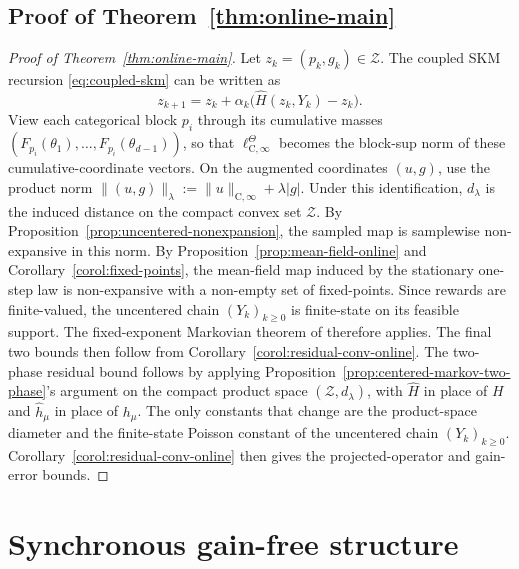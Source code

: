\documentclass{article}
\begin{document}
\subsection{Proof of Theorem~\ref{thm:online-main}}
\begin{proof}[Proof of Theorem~\ref{thm:online-main}]
Let $z_k = (p_k, g_k) \in \mathcal Z$. The coupled SKM recursion \eqref{eq:coupled-skm} can be written as
\begin{equation}
z_{k+1} = z_k + \alpha_k\bigl( \widehat H(z_k, Y_k) - z_k\bigr).
\end{equation}
View each categorical block $p_i$ through its cumulative masses $(F_{p_i}(\theta_1),\ldots,F_{p_i}(\theta_{d-1}))$, so that $\ell^\Theta_{\mathrm C,\infty}$ becomes the block-sup norm of these cumulative-coordinate vectors. On the augmented coordinates $(u,g)$, use the product norm $\lVert(u, g)\rVert_\lambda := \lVert u \rVert_{\mathrm{C},\infty} + \lambda \lvert g \rvert$. Under this identification, $d_\lambda$ is the induced distance on the compact convex set $\mathcal Z$. By Proposition~\ref{prop:uncentered-nonexpansion}, the sampled map is samplewise non-expansive in this norm. By Proposition~\ref{prop:mean-field-online} and Corollary~\ref{corol:fixed-points}, the mean-field map induced by the stationary one-step law is non-expansive with a non-empty set of fixed-points. Since rewards are finite-valued, the uncentered chain $(Y_k)_{k\ge0}$ is finite-state on its feasible support. The fixed-exponent Markovian theorem of \citet{blaser2026asymptotic} therefore applies. The final two bounds then follow from Corollary~\ref{corol:residual-conv-online}. The two-phase residual bound follows by applying Proposition~\ref{prop:centered-markov-two-phase}'s argument on the compact product space $(\mathcal Z, d_\lambda)$, with $\widehat H$ in place of $H$ and $\hat{h}_\mu$ in place of $h_\mu$. The only constants that change are the product-space diameter and the finite-state Poisson constant of the uncentered chain $(Y_k)_{k \ge 0}$. Corollary~\ref{corol:residual-conv-online} then gives the projected-operator and gain-error bounds.
\end{proof}

\newpage
\section{Synchronous gain-free structure}\label{sec:synchronous}
\end{document}
